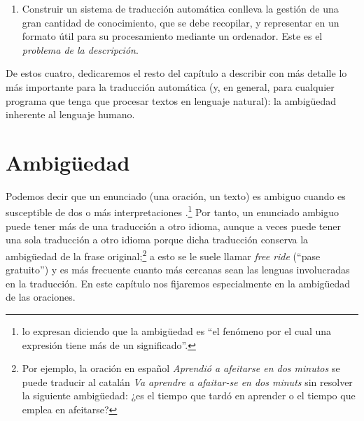 \begin{enumerate}
\item Construir un sistema de traducción automática conlleva la gestión de una gran cantidad de conocimiento, que se debe recopilar, y representar en un formato útil para su procesamiento mediante un ordenador. Este es el \emph{problema de la descripción}. \end{enumerate} 

De estos cuatro, dedicaremos el resto del capítulo a describir con más detalle lo más importante para la traducción automática (y, en general, para cualquier programa que tenga que procesar textos en lenguaje natural): la ambigüedad inherente al lenguaje humano. 

\section{Ambigüedad} 

Podemos decir que un enunciado (una oración, un texto) es ambiguo cuando es susceptible de dos o más interpretaciones \citep{alcaraz97b}.\footnote{\citet{don96u} lo expresan diciendo que la ambigüedad es ``el fenómeno por el cual una expresión tiene más de un significado''.} Por tanto, un enunciado ambiguo puede tener más de una traducción a otro idioma, aunque a veces puede tener una sola traducción a otro idioma porque dicha traducción conserva la ambigüedad de la frase original;\footnote{Por ejemplo, la oración en español \emph{Aprendió a afeitarse en dos minutos} se puede traducir al catalán \emph{Va aprendre a afaitar-se en dos minuts} sin resolver la siguiente ambigüedad: ¿es el tiempo que tardó en aprender o el tiempo que emplea en afeitarse?} a esto se le suele llamar \emph{free ride} (``pase gratuito'') y es más frecuente cuanto más cercanas sean las lenguas involucradas en la traducción. En este capítulo nos fijaremos especialmente en la ambigüedad de las oraciones. 

